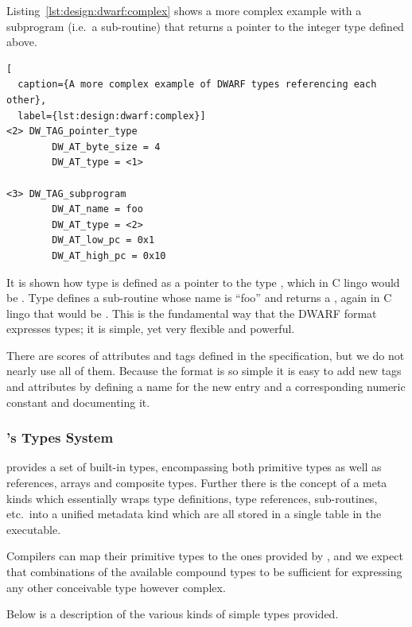 Listing~\ref{lst:design:dwarf:complex} shows a more complex example with a
subprogram (i.e.~a sub-routine) that returns a pointer to the integer type
defined above.

\begin{minipage}{\linewidth}
\begin{lstlisting}[
  caption={A more complex example of DWARF types referencing each other},
  label={lst:design:dwarf:complex}]
<2> DW_TAG_pointer_type
        DW_AT_byte_size = 4
        DW_AT_type = <1>

<3> DW_TAG_subprogram
        DW_AT_name = foo
        DW_AT_type = <2>
        DW_AT_low_pc = 0x1
        DW_AT_high_pc = 0x10
\end{lstlisting}
\end{minipage}

It is shown how type  is defined as a pointer to the type ,
which in C lingo would be . Type  defines a sub-routine
whose name is ``foo'' and returns a , again in C lingo that would be
. This is the fundamental way that the DWARF format
expresses types; it is simple, yet very flexible and powerful.

There are scores of attributes and tags defined in the specification, but we do
not nearly use all of them. Because the format is so simple it is easy to add
new tags and attributes by defining a name for the new entry and a corresponding
numeric constant and documenting it.

\subsubsection{\thename{}'s Types System}
\label{sec:design:type-system}

\thename{} provides a set of built-in types, encompassing both primitive types
as well as references, arrays and composite types. Further there is the concept
of a meta kinds which essentially wraps type definitions, type references,
sub-routines, etc.~into a unified metadata kind which are all stored in a single
table in the executable.

Compilers can map their primitive types to the ones provided by \thename{}, and
we expect that combinations of the available compound types to be sufficient for
expressing any other conceivable type however complex.

Below is a description of the various kinds of simple types provided.

